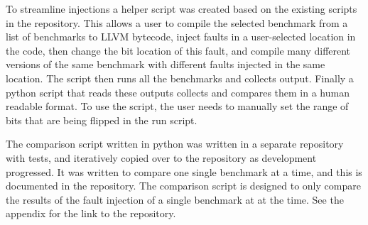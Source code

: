 To streamline injections a helper script was created based on the existing scripts in the \taffo{} repository. This allows a user to compile the selected benchmark from a list of benchmarks to LLVM bytecode, inject faults in a user-selected location in the code, then change the bit location of this fault, and compile many different versions of the same benchmark with different faults injected in the same location. The script then runs all the benchmarks and collects output. Finally a python script that reads these outputs collects and compares them in a human readable format. To use the script, the user needs to manually set the range of bits that are being flipped in the run script. 

The comparison script written in python was written in a separate repository with tests, and iteratively copied over to the \taffo{} repository as development progressed. It was written to compare one single benchmark at a time, and this is documented in the repository. The comparison script is designed to only compare the results of the fault injection of a single benchmark at at the time. See the appendix for the link to the repository.




